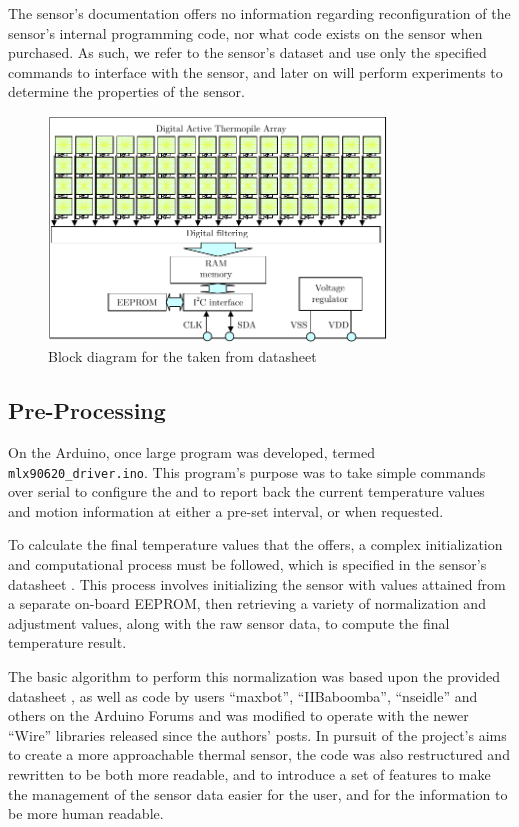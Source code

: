 \documentclass[../thesis/thesis.tex]{subfiles}
\begin{document}
The sensor's documentation offers no information regarding reconfiguration of the sensor's internal programming code, nor what code exists on the sensor when purchased. As such, we refer to the sensor's dataset \cite{MLXDatasheet} and use only the specified commands to interface with the sensor, and later on will perform experiments to determine the properties of the sensor.

\begin{figure}
\centering
\includegraphics[width=0.8\textwidth]{../diagrams/mlx-block-diagram.pdf}
\caption{Block diagram for the \mlx taken from datasheet \cite{MLXDatasheet}}
\label{fig:exps:blockdia}
\end{figure}

\subsection{Pre-Processing}

On the Arduino, once large program was developed, termed \texttt{mlx90620\_driver.ino}. This program's purpose was to take simple commands over serial to configure the \mlx and to report back the current temperature values and \pir motion information at either a pre-set interval, or when requested.

To calculate the final temperature values that the \mlx offers, a complex initialization and computational process must be followed, which is specified in the sensor's datasheet \cite{MLXDatasheet}. This process involves initializing the sensor with values attained from a separate on-board \iic EEPROM, then retrieving a variety of normalization and adjustment values, along with the raw sensor data, to compute the final temperature result.

The basic algorithm to perform this normalization was based upon the provided datasheet \cite{MLXDatasheet}, as well as code by users ``maxbot'', ``IIBaboomba'', ``nseidle'' and others on the Arduino Forums \cite{ArduinoForum} and was modified to operate with the newer \ard ``Wire'' \iic libraries released since the authors' posts. In pursuit of the project's aims to create a more approachable thermal sensor, the code was also restructured and rewritten to be both more readable, and to introduce a set of features to make the management of the sensor data easier for the user, and for the information to be more human readable.
\end{document}
